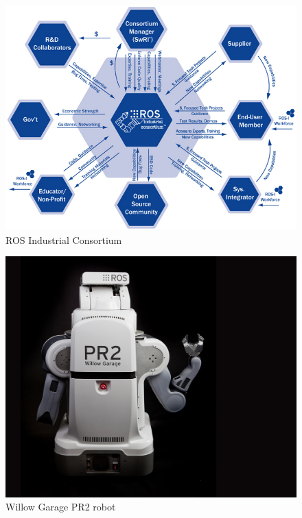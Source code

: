 \begin{figure}
    \centering
    \includegraphics[scale=0.3]{Images/Chapter 2/ros_consortium.jpg}
    \caption{ROS Industrial Consortium}
    \label{fig:ros_consortium}
\end{figure}
\begin{figure}[H]
    \centering
    \includegraphics[scale=0.16]{Images/Chapter 2/PR2_Robot_Willow_Garage_6-1.jpeg}
    \caption{Willow Garage PR2 robot}
    \label{fig:PR2}
\end{figure}
\newpage

